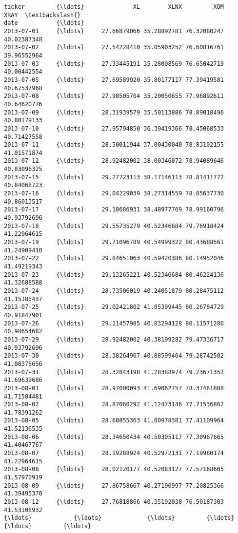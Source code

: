 \documentclass[11pt]{article}
\begin{document}
\begin{Verbatim}[commandchars=\\\{\}]
ticker         {\ldots}              XL        XLNX         XOM        XRAY  \textbackslash{}
date           {\ldots}                                                       
2013-07-01     {\ldots}     27.66879066 35.28892781 76.32080247 40.02387348   
2013-07-02     {\ldots}     27.54228410 35.05903252 76.60816761 39.96552964   
2013-07-03     {\ldots}     27.33445191 35.28008569 76.65042719 40.00442554   
2013-07-05     {\ldots}     27.69589920 35.80177117 77.39419581 40.67537968   
2013-07-08     {\ldots}     27.98505704 35.20050655 77.96892611 40.64620776   
2013-07-09     {\ldots}     28.31939579 35.50113886 78.89018496 40.80179133   
2013-07-10     {\ldots}     27.95794850 36.39419366 78.45068533 40.71427558   
2013-07-11     {\ldots}     28.50011944 37.00430040 78.83102155 41.01571874   
2013-07-12     {\ldots}     28.92482002 38.00346072 78.94089646 40.83096325   
2013-07-15     {\ldots}     29.27723113 38.17146113 78.81411772 40.84068723   
2013-07-16     {\ldots}     29.04229039 38.27314559 78.85637730 40.86013517   
2013-07-17     {\ldots}     29.18686931 38.48977769 78.99160796 40.93792696   
2013-07-18     {\ldots}     29.55735279 40.52346684 79.76918424 41.22964615   
2013-07-19     {\ldots}     29.71096789 40.54999322 80.43688561 41.24909410   
2013-07-22     {\ldots}     29.84651063 40.59420386 80.14952046 41.49219343   
2013-07-23     {\ldots}     29.13265221 40.52346684 80.46224136 41.32688588   
2013-07-24     {\ldots}     28.73506019 40.24051879 80.28475112 41.15185437   
2013-07-25     {\ldots}     29.02421802 41.05399445 80.26784729 40.91847901   
2013-07-26     {\ldots}     29.11457985 40.83294128 80.11571280 40.98654682   
2013-07-29     {\ldots}     28.92482002 40.38199282 79.47336717 40.93792696   
2013-07-30     {\ldots}     28.38264907 40.88599404 79.28742502 41.08378656   
2013-07-31     {\ldots}     28.32843198 41.28388974 79.23671352 41.69639686   
2013-08-01     {\ldots}     28.97000093 41.69062757 78.37461808 41.71584481   
2013-08-02     {\ldots}     28.87060292 41.12473146 77.71536862 41.78391262   
2013-08-05     {\ldots}     28.60855363 41.00978381 77.41109964 41.52136535   
2013-08-06     {\ldots}     28.34650434 40.50305117 77.30967665 41.40467767   
2013-08-07     {\ldots}     28.19288924 40.52972131 77.19980174 41.22964615   
2013-08-08     {\ldots}     28.02120177 40.52083127 77.57168605 41.57970919   
2013-08-09     {\ldots}     27.86758667 40.27190997 77.20825366 41.39495370   
2013-08-12     {\ldots}     27.76818866 40.35192038 76.50187303 41.53108932   
{\ldots}            {\ldots}             {\ldots}         {\ldots}         {\ldots}         {\ldots}   

\end{Verbatim}
\end{document}
